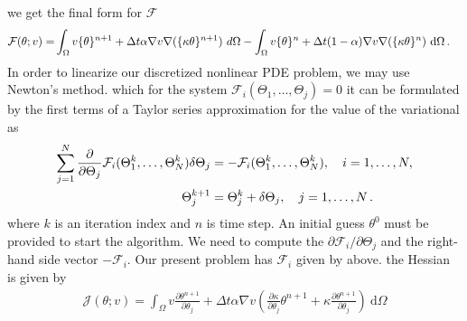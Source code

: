 \documentclass[]{article}
\begin{document}
we get the final form for $\mathcal{F}$
\begin{equation}\label{eq13}
	\begin{aligned}
		\mathcal{F}(\theta; v) =& \int_{\Omega} v \{\theta\}^{n+1} + \Delta t \alpha\nabla v \nabla(\{\kappa \theta\}^{n+1}) \ d \Omega - \int_{\Omega} v\{\theta\}^{n} + \Delta t (1-\alpha) \nabla v\nabla(\{\kappa \theta\}^{n}) \ \mathrm{d} \Omega\thinspace.
	\end{aligned}
\end{equation}
In order to linearize our discretized nonlinear PDE problem, we may use Newton’s method. which for the system $\mathcal{F}_i(\Theta_1,\ldots,\Theta_j)=0$ it can be formulated by the first terms of a Taylor series approximation for the value of the variational as
\begin{equation}\label{eq11}
	\begin{aligned}
		\sum_{j=1}^N {\partial \over\partial \Theta_j} \mathcal{F}_i(\Theta_1^k,\ldots,\Theta_N^k)\delta \Theta_j &= -\mathcal{F}_i(\Theta_1^k,\ldots,\Theta_N^k),\quad i=1, \ldots ,N,\\ \Theta_j^{k+1} &= \Theta_j^k + \delta \Theta_j,\quad j=1, \ldots ,N\thinspace.
	\end{aligned}
\end{equation}
where $k$ is an iteration index and $n$ is time step. An initial guess $\theta^0$ must be provided to start the algorithm.
We need to compute the $\partial \mathcal{F}_i/\partial \Theta_j$ and the right-hand side vector $-\mathcal{F}_i$. Our present problem has $\mathcal{F}_i$ given by above. the Hessian is given by
\begin{equation}\label{eq11}
	\begin{aligned}
		\mathcal{J}(\theta;v)= \int_{\Omega} v \frac{\partial \theta^{n+1}}{\partial \theta_j} + \Delta t \alpha  \nabla v (\frac{\partial \kappa}{\partial \theta_j}\theta^{n+1} + \kappa\frac{\partial \theta^{n+1}}{\partial \theta_j}) \ \mathrm{d} \Omega
	\end{aligned}
\end{equation}
\end{document}
